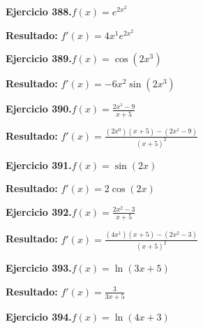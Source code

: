 \documentclass[10pt,a4paper]{article}
\begin{document}
\newpage
\begin{ejbox}
\textbf{Ejercicio 388.}\quad $f(x) = e^{2x^{2}}$
\end{ejbox}

\begin{solbox}
\textbf{Resultado:} \(\displaystyle f'(x) = 4x^{1}e^{2x^{2}}\)
\end{solbox}

\begin{ejbox}
\textbf{Ejercicio 389.}\quad $f(x) = \cos(2x^{3})$
\end{ejbox}

\begin{solbox}
\textbf{Resultado:} \(\displaystyle f'(x) = -6x^{2}\sin(2x^{3})\)
\end{solbox}

\begin{ejbox}
\textbf{Ejercicio 390.}\quad $f(x) = \frac{2x^{1} -9}{x + 5}$
\end{ejbox}

\begin{solbox}
\textbf{Resultado:} \(\displaystyle f'(x) = \frac{(2x^{0})(x+5) - (2x^{1} -9)}{(x+5)^2}\)
\end{solbox}

\newpage
\begin{ejbox}
\textbf{Ejercicio 391.}\quad $f(x) = \sin(2x)$
\end{ejbox}

\begin{solbox}
\textbf{Resultado:} \(\displaystyle f'(x) = 2\cos(2x)\)
\end{solbox}

\begin{ejbox}
\textbf{Ejercicio 392.}\quad $f(x) = \frac{2x^{2} -3}{x + 5}$
\end{ejbox}

\begin{solbox}
\textbf{Resultado:} \(\displaystyle f'(x) = \frac{(4x^{1})(x+5) - (2x^{2} -3)}{(x+5)^2}\)
\end{solbox}

\begin{ejbox}
\textbf{Ejercicio 393.}\quad $f(x) = \ln(3x + 5)$
\end{ejbox}

\begin{solbox}
\textbf{Resultado:} \(\displaystyle f'(x) = \frac{3}{3x + 5}\)
\end{solbox}

\newpage
\begin{ejbox}
\textbf{Ejercicio 394.}\quad $f(x) = \ln(4x + 3)$
\end{ejbox}
\end{document}
